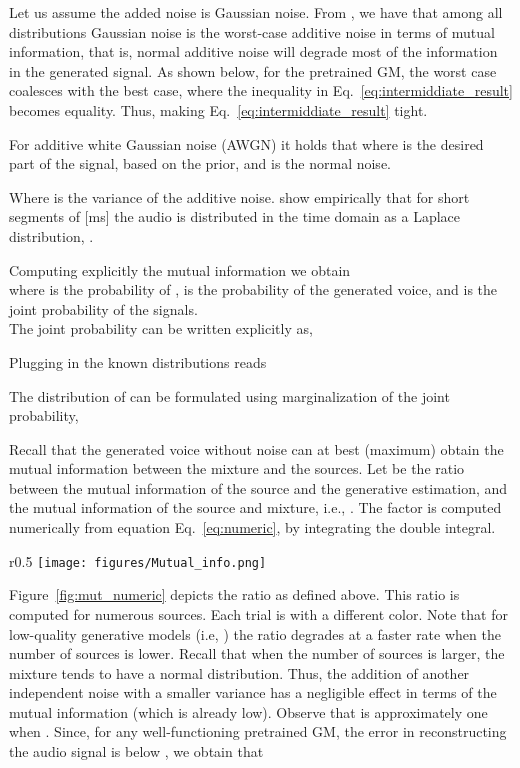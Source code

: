 \documentclass{article}
\theoremstyle{plain}
\theoremstyle{definition}
\theoremstyle{remark}
\begin{document}
Let us assume the added noise is Gaussian noise. From \cite{cover_book}, we have that among all distributions Gaussian noise is the worst-case additive noise in terms of mutual information, that is, normal additive noise will degrade most of the information in the generated signal. As shown below, for the pretrained GM, the worst case coalesces with the best case, where the inequality in Eq.~\ref{eq:intermiddiate_result} becomes equality. Thus, making Eq.~\ref{eq:intermiddiate_result} tight.









For additive white Gaussian noise (AWGN) it holds that  where  is the desired part of the signal, based on the prior, and  is the normal noise.

Where  is the variance of the additive noise.
 \cite{sepit} show empirically that for short segments of [ms] the audio is distributed in the time domain as a Laplace distribution, .


Computing explicitly the mutual information we obtain
\\
where  is the probability of ,  is the probability of the generated voice, and  is the joint probability of the signals.\\
The joint probability can be written explicitly as,

Plugging in the known distributions reads

The distribution of  can be formulated using marginalization of the joint probability, 

Recall that the generated voice without noise can at best (maximum) obtain the mutual information between the mixture and the sources. 
Let  be the ratio between the mutual information of the source and the generative estimation, and the mutual information of the source and mixture, i.e.,    . 
The factor  is computed numerically from equation Eq.~\ref{eq:numeric}, by integrating the double integral. 
\begin{wrapfigure}{r}{0.5\textwidth}
\centering
\texttt{[image: figures/Mutual\_info.png]}
    \caption{ as a function of the noise variance.} \label{fig:mut_numeric}
    \end{wrapfigure}
Figure~\ref{fig:mut_numeric} depicts the ratio  as defined above. This ratio is computed for numerous sources. Each trial is with a different color.
Note that for low-quality generative models (i.e, ) the ratio degrades at a faster rate when the number of sources is lower.
Recall that when the number of sources is larger, the mixture tends to have a normal distribution. Thus, the addition of another independent noise with a smaller variance has a negligible effect in terms of the mutual information (which is already low).
Observe that  is approximately one when . Since, for any well-functioning pretrained GM, the error in reconstructing the audio signal is below  \cite{kong2020diffwave,chen_wavegrad_2020,chen2021wavegrad}, we obtain that 
\end{document}
